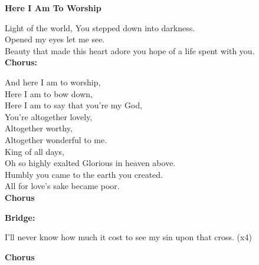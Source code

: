 \textbf{Here I Am To Worship}

Light of the world, You stepped down into darkness. \\
Opened my eyes let me see. \\
Beauty that made this heart adore you hope of a life spent with you. \\

\textbf{Chorus:}

And here I am to worship, \\
Here I am to bow down, \\
Here I am to say that you're my God, \\
You're altogether lovely, \\
Altogether worthy, \\
Altogether wonderful to me. \\

King of all days, \\
Oh so highly exalted Glorious in heaven above. \\
Humbly you came to the earth you created. \\
All for love's sake became poor. \\

\textbf{Chorus}

\textbf{Bridge:}

I'll never know how much it cost to see my sin upon that cross. (x4)

\textbf{Chorus}
